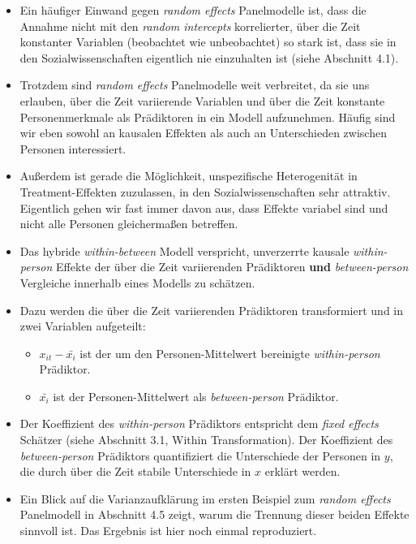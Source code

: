 \documentclass[
]{book}
\providecommand{\tightlist}{%
  \setlength{\itemsep}{0pt}\setlength{\parskip}{0pt}}
\begin{document}
\begin{itemize}
\item
  Ein häufiger Einwand gegen \emph{random effects} Panelmodelle ist, dass die Annahme nicht mit den \emph{random intercepts} korrelierter, über die Zeit konstanter Variablen (beobachtet wie unbeobachtet) so stark ist, dass sie in den Sozialwissenschaften eigentlich nie einzuhalten ist (siehe Abschnitt 4.1).
\item
  Trotzdem sind \emph{random effects} Panelmodelle weit verbreitet, da sie uns erlauben, über die Zeit variierende Variablen und über die Zeit konstante Personenmerkmale als Prädiktoren in ein Modell aufzunehmen. Häufig sind wir eben sowohl an kausalen Effekten als auch an Unterschieden zwischen Personen interessiert.
\item
  Außerdem ist gerade die Möglichkeit, unspezifische Heterogenität in Treatment-Effekten zuzulassen, in den Sozialwissenschaften sehr attraktiv. Eigentlich gehen wir fast immer davon aus, dass Effekte variabel sind und nicht alle Personen gleichermaßen betreffen.
\item
  Das hybride \emph{within-between} Modell verspricht, unverzerrte kausale \emph{within-person} Effekte der über die Zeit variierenden Prädiktoren \textbf{und} \emph{between-person} Vergleiche innerhalb eines Modells zu schätzen.
\item
  Dazu werden die über die Zeit variierenden Prädiktoren transformiert und in zwei Variablen aufgeteilt:

  \begin{itemize}
  \tightlist
  \item
    \(x_{it}-\bar{x_i}\) ist der um den Personen-Mittelwert bereinigte \emph{within-person} Prädiktor.
  \item
    \(\bar{x_i}\) ist der Personen-Mittelwert als \emph{between-person} Prädiktor.
  \end{itemize}
\item
  Der Koeffizient des \emph{within-person} Prädiktors entspricht dem \emph{fixed effects} Schätzer (siehe Abschnitt 3.1, Within Transformation). Der Koeffizient des \emph{between-person} Prädiktors quantifiziert die Unterschiede der Personen in \(y\), die durch über die Zeit stabile Unterschiede in \(x\) erklärt werden.
\item
  Ein Blick auf die Varianzaufklärung im ersten Beispiel zum \emph{random effects} Panelmodell in Abschnitt 4.5 zeigt, warum die Trennung dieser beiden Effekte sinnvoll ist. Das Ergebnis ist hier noch einmal reproduziert.
\end{itemize}
\end{document}
